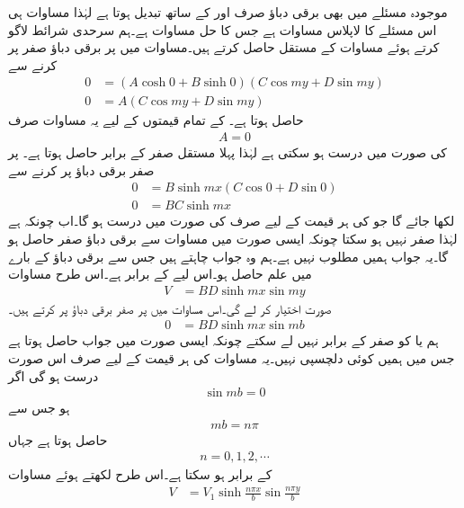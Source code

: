 موجودہ مسئلے میں بھی برقی دباؤ صرف  اور  کے ساتھ تبدیل ہوتا ہے لہٰذا مساوات  ہی اس مسئلے کا لاپلاس مساوات ہے جس کا حل مساوات  ہے۔ہم سرحدی شرائط لاگو کرتے ہوئے مساوات کے مستقل حاصل کرتے ہیں۔مساوات  میں  پر برقی دباؤ صفر پر کرنے سے
\begin{align*}
0&=\left( A \cosh 0+B \sinh 0\right) \left(C \cos m y+D \sin m y \right)\\
0&=A \left(C \cos m y+D \sin m y \right)
\end{align*}
حاصل ہوتا ہے۔  کے تمام قیمتوں کے لیے یہ مساوات صرف 
\begin{align*}
A=0
\end{align*}
کی صورت میں درست ہو سکتی ہے لہٰذا پہلا مستقل صفر کے برابر حاصل ہوتا ہے۔ پر صفر برقی دباؤ پر کرنے سے
\begin{align*}
0&=B \sinh mx  \left(C \cos 0+D \sin 0 \right)\\
0&=BC \sinh mx 
\end{align*}
لکھا جائے گا جو  کی ہر قیمت کے لیے صرف  کی صورت میں درست ہو گا۔اب چونکہ  ہے لہٰذا  صفر نہیں ہو سکتا چونکہ ایسی صورت میں مساوات  سے برقی دباؤ صفر حاصل ہو گا۔یہ جواب ہمیں مطلوب نہیں ہے۔ہم وہ جواب چاہتے ہیں جس سے برقی دباؤ کے بارے میں علم حاصل ہو۔اس لیے  کے برابر ہے۔اس طرح مساوات 
\begin{align}\label{مساوات_لاپلاس_ڈبہ_مثال}
V&=BD \sinh mx  \sin m y 
\end{align}
صورت اختیار کر لے گی۔اس مساوات میں  پر صفر برقی دباؤ پر کرتے ہیں۔
 \begin{align*}
0&=BD \sinh mx  \sin m b 
\end{align*}
ہم  یا  کو صفر کے برابر نہیں لے سکتے چونکہ ایسی صورت میں  جواب حاصل ہوتا ہے جس میں ہمیں کوئی دلچسپی نہیں۔یہ مساوات  کی ہر قیمت کے لیے صرف اس صورت درست ہو گی اگر 
\begin{align*}
\sin mb=0
\end{align*}
ہو جس سے
\begin{align*}
mb = n\pi 
\end{align*}
حاصل ہوتا ہے جہاں
\begin{align*}
n=0,1,2,\cdots
\end{align*}
کے برابر ہو سکتا ہے۔اس طرح  لکھتے ہوئے مساوات 
\begin{align}\label{مساوات_لاپلاس_ڈبہ_مثال_تین_شرائط_پورے}
V&=V_1 \sinh \frac{n\pi x}{b}  \sin \frac{n\pi y}{b} 
\end{align}
